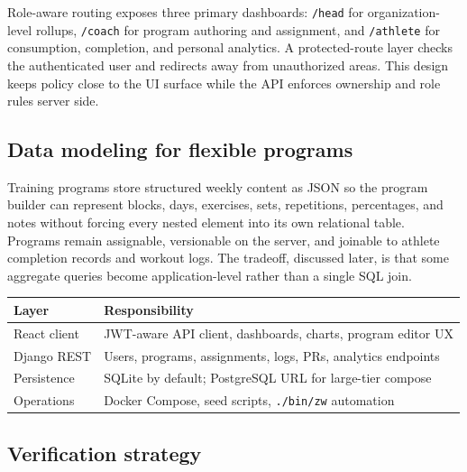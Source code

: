 \documentclass[
  letterpaper,
  DIV=11,
  numbers=noendperiod]{scrartcl}
\begin{document}
Role-aware routing exposes three primary dashboards: \texttt{/head} for
organization-level rollups, \texttt{/coach} for program authoring and
assignment, and \texttt{/athlete} for consumption, completion, and
personal analytics. A protected-route layer checks the authenticated
user and redirects away from unauthorized areas. This design keeps
policy close to the UI surface while the API enforces ownership and role
rules server side.

\subsection{Data modeling for flexible
programs}\label{data-modeling-for-flexible-programs}

Training programs store structured weekly content as JSON so the program
builder can represent blocks, days, exercises, sets, repetitions,
percentages, and notes without forcing every nested element into its own
relational table. Programs remain assignable, versionable on the server,
and joinable to athlete completion records and workout logs. The
tradeoff, discussed later, is that some aggregate queries become
application-level rather than a single SQL join.

\begin{strip}
\noindent\begin{minipage}{\textwidth}
\centering
\small
\begin{tabular}{lp{}}
\toprule
\textbf{Layer} & \textbf{Responsibility} \\
\midrule
React client & JWT-aware API client, dashboards, charts, program editor UX \\
Django REST & Users, programs, assignments, logs, PRs, analytics endpoints \\
Persistence & SQLite by default; PostgreSQL URL for large-tier compose \\
Operations & Docker Compose, seed scripts, \texttt{./bin/zw} automation \\
\bottomrule
\end{tabular}
\label{tbl-layers}
\end{minipage}
\end{strip}
\FloatBarrier

\subsection{Verification strategy}\label{verification-strategy}
\end{document}
